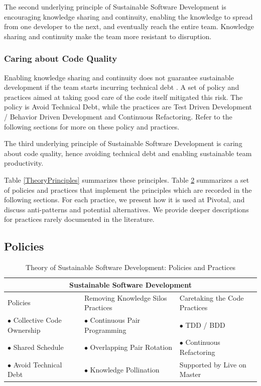 \begin{table}[]
The second underlying principle of Sustainable Software Development is encouraging knowledge sharing and continuity, enabling the knowledge to spread from one developer to the next, and eventually reach the entire team. Knowledge sharing and continuity make the team more resistant to disruption. 

\subsubsection{Caring about Code Quality}

Enabling knowledge sharing and continuity does not guarantee sustainable development if the team starts incurring technical debt  \cite{McConnellTechnicalDebt}. A set of policy and practices aimed at taking good care of the code itself mitigated this risk. The policy is Avoid Technical Debt, while the practices are Test Driven Development / Behavior Driven Development and Continuous Refactoring. Refer to the following sections for more on these policy and practices.

The third underlying principle of Sustainable Software Development is caring about code quality, hence avoiding technical debt and enabling sustainable team productivity.

Table \ref{TheoryPrinciples} summarizes these principles. Table \ref{TheoryPractices}  summarizes a set of policies and practices that implement the principles which are recorded in the following sections. For each practice, we present how it is used at Pivotal, and discuss anti-patterns and potential alternatives. We provide deeper descriptions for practices rarely documented in the literature.
\subsection{Policies}

\begin{table}[]
\renewcommand{\arraystretch}{1.5}
\centering
\caption{Theory of Sustainable Software Development: Policies and Practices}
\label{TheoryPractices}
\begin{tabular}{l|l|l}
\hline
\multicolumn{3}{c}{Sustainable Software Development}                               \\
\hline
Policies                  & Removing Knowledge Silos Practices & Caretaking the Code Practices       \\
$\bullet$ Collective Code Ownership & $\bullet$ Continuous Pair Programming         & $\bullet$  TDD / BDD                   \\
$\bullet$ Shared Schedule           & $\bullet$ Overlapping Pair Rotation & $\bullet$ Continuous Refactoring      \\
$\bullet$ Avoid Technical Debt      & $\bullet$  Knowledge Pollination    & Supported by Live on Master \\ 
\hline
\end{tabular}
\end{table}


\end{table}
